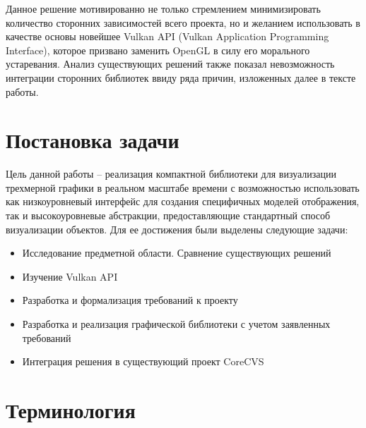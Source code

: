 \documentclass[14pt]{matmex-diploma}
\begin{document}
Данное решение мотивированно не только стремлением минимизировать количество сторонних зависимостей всего проекта, но и желанием использовать в качестве основы новейшее Vulkan API \cite{spec:vulkan} (Vulkan Application Programming Interface), которое призвано заменить OpenGL в силу его морального устаревания. Анализ существующих решений также показал невозможность интеграции сторонних библиотек ввиду ряда причин, изложенных далее в тексте работы. 

\section{Постановка задачи}

Цель данной работы -- реализация компактной библиотеки для визуализации трехмерной графики в реальном масштабе времени с возможностью использовать как низкоуровневый интерфейс для создания специфичных моделей отображения, так и высокоуровневые абстракции, предоставляющие стандартный способ визуализации объектов. Для ее достижения были выделены следующие задачи:

\begin{itemize}
    \item Исследование предметной области. Сравнение существующих решений
    \item Изучение Vulkan API
    \item Разработка и формализация требований к проекту
    \item Разработка и реализация графической библиотеки с учетом заявленных требований
    \item Интеграция решения в существующий проект CoreCVS
\end{itemize}


\section{Терминология}
\end{document}
